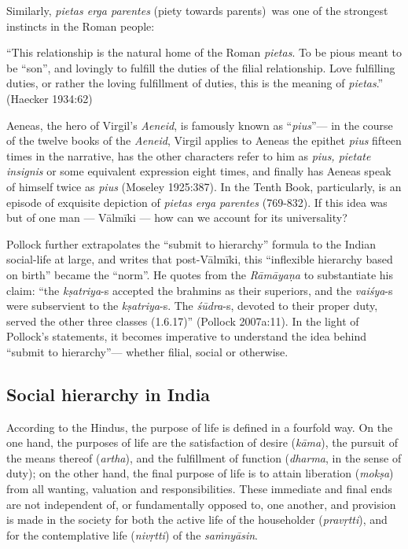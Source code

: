 Similarly, {\sl pietas erga parentes} (piety towards parents) was one of the strongest instincts in the Roman people: 

\begin{myquote}
“This relationship is the natural home of the Roman {\sl pietas}. To be pious meant to be “son”, and lovingly to fulfill the duties of the filial relationship. Love fulfilling duties, or rather the loving fulfillment of duties, this is the meaning of {\sl pietas}.”
\hfill (Haecker 1934:62)
\end{myquote}

Aeneas, the hero of Virgil’s {\sl Aeneid}, is famously known as “{\sl pius}”--- in the course of the twelve books of the {\sl Aeneid}, Virgil applies to Aeneas the epithet {\sl pius} fifteen times in the narrative, has the other characters refer to him as {\sl pius, pietate insignis} or some equivalent expression eight times, and finally has Aeneas speak of himself twice as {\sl pius} (Moseley 1925:387). In the Tenth Book, particularly, is an episode of exquisite depiction of {\sl pietas erga parentes} (769-832). If this idea was but of one man --- Vālmīki --- how can we account for its universality? 

Pollock further extrapolates the “submit to hierarchy” formula to the Indian social-life at large, and writes that post-Vālmīki, this “inflexible hierarchy based on birth” became the “norm”. He quotes from the {\sl Rāmāyaṇa} to substantiate his claim: “the {\sl kṣatriya}-s accepted the brahmins as their superiors, and the {\sl vaiśya}-s were subservient to the {\sl kṣatriya}-s. The {\sl śūdra}-s, devoted to their proper duty, served the other three classes (1.6.17)'' (Pollock 2007a:11). In the light of Pollock’s statements, it becomes imperative to understand the idea behind “submit to hierarchy”— whether filial, social or otherwise. 

\subsection[Social hierarchy in India]{Social hierarchy in India}\label{sec1.3.1}

According to the Hindus, the purpose of life is defined in a fourfold way. On the one hand, the purposes of life are the satisfaction of desire ({\sl kāma}), the pursuit of the means thereof ({\sl artha}), and the fulfillment of function ({\sl dharma}, in the sense of duty); on the other hand, the final purpose of life is to attain liberation ({\sl mokṣa}) from all wanting, valuation and responsibilities. These immediate and final ends are not independent of, or fundamentally opposed to, one another, and provision is made in the society for both the active life of the householder ({\sl pravṛtti}), and for the contemplative life ({\sl nivṛtti}) of the {\sl saṁnyāsin}.  

